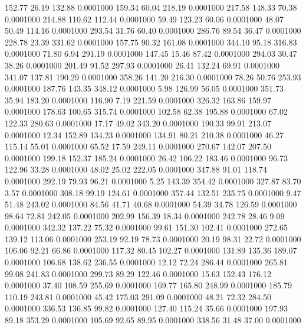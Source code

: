  152.77   26.19  132.88   0.0001000
 159.34   60.04  218.19   0.0001000
 217.58  148.33   70.38   0.0001000
 214.88  110.62  112.44   0.0001000
  59.49  123.23   60.06   0.0001000
  48.07   50.49  114.16   0.0001000
 293.54   31.76   60.40   0.0001000
 286.76   89.54   36.47   0.0001000
 228.78   23.39  331.62   0.0001000
 157.75   90.32  161.08   0.0001000
 344.10   95.18  316.83   0.0001000
  71.80    6.94  291.19   0.0001000
 147.45   15.46   87.42   0.0001000
 294.03   30.47   38.26   0.0001000
 201.49   91.52  297.93   0.0001000
  26.41  132.24   69.91   0.0001000
 341.07  137.81  190.29   0.0001000
 358.26  141.20  216.30   0.0001000
  78.26   50.76  253.93   0.0001000
 187.76  143.35  348.12   0.0001000
   5.98  126.99   56.05   0.0001000
 351.73   35.94  183.20   0.0001000
 116.90    7.19  221.59   0.0001000
 326.32  163.86  159.97   0.0001000
 178.63  100.65  315.74   0.0001000
 102.58   62.38  195.88   0.0001000
  67.02  122.33  280.63   0.0001000
  17.17   49.02  343.20   0.0001000
 190.33   99.91  213.07   0.0001000
  12.34  152.89  134.23   0.0001000
 134.91   80.21  210.38   0.0001000
  46.27  115.14   55.01   0.0001000
  65.52   17.59  249.11   0.0001000
 270.67  142.07  207.50   0.0001000
 199.18  152.37  185.24   0.0001000
  26.42  106.22  183.46   0.0001000
  96.73  122.96   33.28   0.0001000
  48.02   25.02  222.05   0.0001000
 347.88   91.01  118.74   0.0001000
 292.19   79.93   96.21   0.0001000
   5.25  143.39  354.42   0.0001000
 327.87   83.70    3.57   0.0001000
 308.18   99.19  124.61   0.0001000
 357.44  132.51  235.75   0.0001000
   9.47   51.48  243.02   0.0001000
  84.56   41.71   40.68   0.0001000
  54.39   34.78  126.59   0.0001000
  98.64   72.81  242.05   0.0001000
 202.99  156.39   18.34   0.0001000
 242.78   28.46    9.09   0.0001000
 342.32  137.22   75.32   0.0001000
  99.61  151.30  102.41   0.0001000
 272.65  139.12  113.06   0.0001000
 253.19   92.19   78.73   0.0001000
  20.19   98.31   22.72   0.0001000
 106.06   92.21   66.86   0.0001000
 117.32   80.45  102.27   0.0001000
 131.89  135.36  189.07   0.0001000
 106.68  138.62  236.55   0.0001000
  12.12   72.24  286.44   0.0001000
 265.81   99.08  241.83   0.0001000
 299.73   89.29  122.46   0.0001000
  15.63  152.43  176.12   0.0001000
  37.40  108.59  255.69   0.0001000
 169.77  165.80  248.99   0.0001000
 185.79  110.19  243.81   0.0001000
  45.42  175.03  291.09   0.0001000
  48.21   72.32  284.50   0.0001000
 336.53  136.85   99.82   0.0001000
 127.40  115.24   35.66   0.0001000
 197.93   89.18  353.29   0.0001000
 105.69   92.65   89.95   0.0001000
 338.56   31.48   37.00   0.0001000
